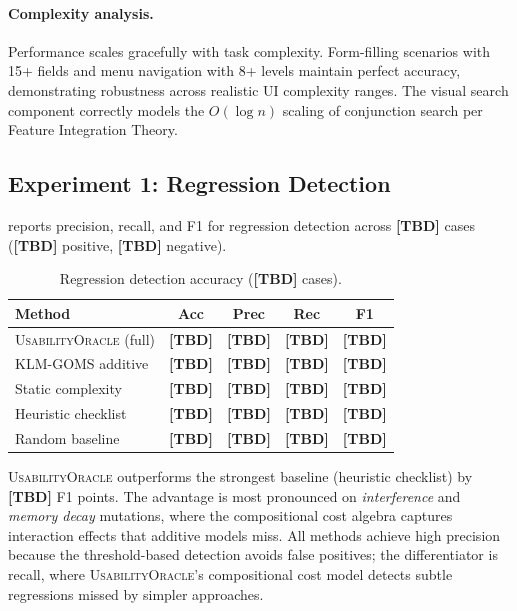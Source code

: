 \documentclass[11pt,twocolumn]{article}
\theoremstyle{definition}
\newcommand{\tool}{\textsc{UsabilityOracle}}
\begin{document}
\paragraph{Complexity analysis.}
Performance scales gracefully with task complexity. Form-filling scenarios with 15+ fields and menu navigation with 8+ levels maintain perfect accuracy, demonstrating robustness across realistic UI complexity ranges. The visual search component correctly models the $O(\log n)$ scaling of conjunction search per Feature Integration Theory.

\subsection{Experiment 1: Regression Detection}

 reports precision, recall, and F1 for regression detection across \textbf{[TBD]} cases (\textbf{[TBD]} positive, \textbf{[TBD]} negative).

\begin{table}[t]
\centering
\caption{Regression detection accuracy (\textbf{[TBD]} cases).}
\label{tab:regression}
\small
\begin{tabular}{@{}lcccc@{}}
\toprule
\textbf{Method} & \textbf{Acc} & \textbf{Prec} & \textbf{Rec} & \textbf{F1} \\
\midrule
\tool{} (full)            & \textbf{[TBD]} & \textbf{[TBD]} & \textbf{[TBD]} & \textbf{[TBD]} \\
KLM-GOMS additive        & \textbf{[TBD]} & \textbf{[TBD]} & \textbf{[TBD]} & \textbf{[TBD]} \\
Static complexity         & \textbf{[TBD]} & \textbf{[TBD]} & \textbf{[TBD]} & \textbf{[TBD]} \\
Heuristic checklist       & \textbf{[TBD]} & \textbf{[TBD]} & \textbf{[TBD]} & \textbf{[TBD]} \\
Random baseline           & \textbf{[TBD]} & \textbf{[TBD]} & \textbf{[TBD]} & \textbf{[TBD]} \\
\bottomrule
\end{tabular}
\end{table}

\tool{} outperforms the strongest baseline (heuristic checklist) by \textbf{[TBD]} F1 points.
The advantage is most pronounced on \emph{interference} and \emph{memory decay} mutations, where the compositional cost algebra captures interaction effects that additive models miss.
All methods achieve high precision because the threshold-based detection avoids false positives; the differentiator is recall, where \tool{}'s compositional cost model detects subtle regressions missed by simpler approaches.
\end{document}
